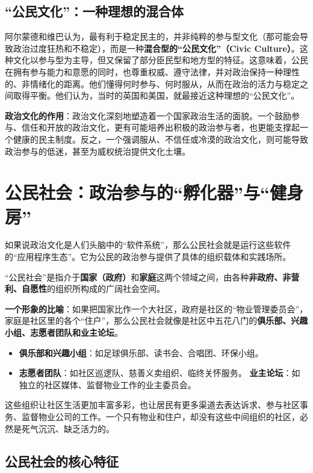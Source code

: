 \subsection{“公民文化”：一种理想的混合体}

阿尔蒙德和维巴认为，最有利于稳定民主的，并非纯粹的参与型文化（那可能会导致政治过度狂热和不稳定），而是一种\textbf{混合型的“公民文化”（Civic Culture）}。这种文化以参与型为主导，但又保留了部分臣民型和地方型的特征。这意味着，公民在拥有参与能力和意愿的同时，也尊重权威、遵守法律，并对政治保持一种理性的、非情绪化的距离。他们懂得何时参与、何时服从，从而在政治的活力与稳定之间取得平衡。他们认为，当时的英国和美国，就最接近这种理想的“公民文化”。

\textbf{政治文化的作用}：政治文化深刻地塑造着一个国家政治生活的面貌。一个鼓励参与、信任和开放的政治文化，更有可能培养出积极的政治参与者，也更能支撑起一个健康的民主制度。反之，一个强调服从、不信任或冷漠的政治文化，则可能导致政治参与的低迷，甚至为威权统治提供文化土壤。

\hrulefill

\section{公民社会：政治参与的“孵化器”与“健身房”}

如果说政治文化是人们头脑中的“软件系统”，那么公民社会就是运行这些软件的“应用程序生态”。它为公民的政治参与提供了具体的组织载体和实践场所。

“公民社会”是指介于\textbf{国家（政府）}和\textbf{家庭}这两个领域之间，由各种\textbf{非政府、非营利、自愿性}的组织所构成的广阔社会空间。

\textbf{一个形象的比喻}：如果把国家比作一个大社区，政府是社区的“物业管理委员会”，家庭是社区里的各个“住户”，那么公民社会就像是社区中五花八门的\textbf{俱乐部、兴趣小组、志愿者团队和业主论坛}。
\begin{itemize}
    \item \textbf{俱乐部和兴趣小组}：如足球俱乐部、读书会、合唱团、环保小组。
    \item \textbf{志愿者团队}：如社区巡逻队、慈善义卖组织、临终关怀服务。
    \textbf{业主论坛}：如独立的社区媒体、监督物业工作的业主委员会。
\end{itemize}

这些组织让社区生活更加丰富多彩，也让居民有更多渠道去表达诉求、参与社区事务、监督物业公司的工作。一个只有物业和住户，却没有这些中间组织的社区，必然是死气沉沉、缺乏活力的。

\subsection{公民社会的核心特征}

